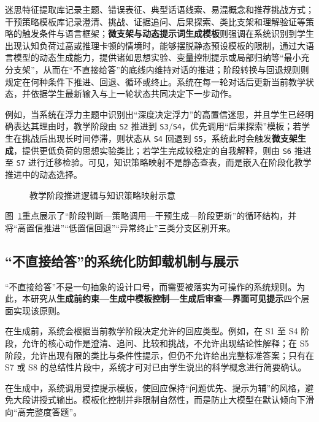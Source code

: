 迷思特征提取库记录主题、错误表征、典型话语线索、易混概念和推荐挑战方式；干预策略模板库记录澄清、挑战、证据追问、后果探索、类比支架和理解验证等策略的触发条件与语言框架；\textbf{微支架与动态提示词生成模板}则强调在系统识别到学生出现认知负荷过高或推理卡顿的情境时，能够摆脱静态预设模板的限制，通过大语言模型的动态生成能力，提供诸如思想实验、变量控制提示或局部归纳等“最小充分支架”，从而在“不直接给答”的底线内维持对话的推进；阶段转换与回退规则则规定在何种条件下推进、回退、循环或终止。系统在每一轮对话后更新当前教学状态，并依据学生最新输入与上一轮状态共同决定下一步动作。

例如，当系统在浮力主题中识别出“深度决定浮力”的高置信迷思，并且学生已经明确表达其理由时，教学阶段由 \texttt{S2} 推进到 \texttt{S3}/\texttt{S4}，优先调用“后果探索”模板；若学生在挑战后出现长时间停滞，则状态从 \texttt{S4} 回退到 \texttt{S5}，系统此时会触发\textbf{微支架生成}，提供更低负荷的思想实验类比；若学生完成较稳定的自我解释，则由 \texttt{S6} 推进至 \texttt{S7} 进行迁移检验。可见，知识策略映射不是静态查表，而是嵌入在阶段化教学推进中的动态选择。

\begin{figure}[htbp]
    \centering
    \caption{教学阶段推进逻辑与知识策略映射示意}
    \label{fig:kb-state-flow}
\end{figure}

图~\ref{fig:kb-state-flow}重点展示了“阶段判断—策略调用—干预生成—阶段更新”的循环结构，并将“高置信推进”“低置信回退”“异常终止”三类分支区别开来。

\subsection{“不直接给答”的系统化防卸载机制与展示}
\label{sec:4.5.3}

“不直接给答”不是一句抽象的设计口号，而需要被落实为可操作的系统规则。为此，本研究从\textbf{生成前约束—生成中模板控制—生成后审查—界面可见提示}四个层面实现该原则。

在生成前，系统会根据当前教学阶段决定允许的回应类型。例如，在 S1 至 S4 阶段，允许的核心动作是澄清、追问、比较和挑战，不允许出现结论性解释；在 S5 阶段，允许出现有限的类比与条件性提示，但仍不允许给出完整标准答案；只有在 S7 或 S8 的总结性片段中，系统才可对已由学生说出的科学概念进行简要确认。

在生成中，系统调用受控提示模板，使回应保持“问题优先、提示为辅”的风格，避免大段讲授式输出。模板化控制并非限制自然性，而是防止大模型在默认倾向下滑向“高完整度答题”。

